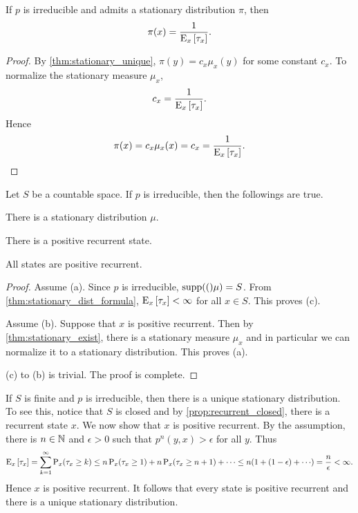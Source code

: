 \begin{theorem}\label{thm:stationary_dist_formula}
    If $p$ is irreducible and admits a stationary distribution $\pi$, 
    then 
    \begin{equation*}
        \pi(x) = \frac{1}{\operatorname{E}_x\left[ {\tau_x} \right]}. 
    \end{equation*}
\end{theorem}
\begin{proof}
    By \cref{thm:stationary_unique}, $\pi(y) = c_x\mu_x(y)$ 
    for some constant $c_x$. To normalize the stationary 
    measure $\mu_x$, 
    \begin{equation*}
        c_x = \frac{1}{\operatorname{E}_x\left[ {\tau_x} \right]}. 
    \end{equation*}
    Hence 
    \begin{equation*}
        \pi(x) = c_x\mu_x(x) = c_x = \frac{1}{\operatorname{E}_x\left[ {\tau_x} \right]}. 
    \end{equation*}
\end{proof}

\begin{theorem}\label{thm:stationary_recurrent}
    Let $S$ be a countable space. If $p$ is irreducible, then the 
    followings are true. 
    \begin{thmenum}
        \item There is a stationary distribution $\mu$. 
        \item There is a positive recurrent state. 
        \item All states are positive recurrent. 
    \end{thmenum}
\end{theorem}
\begin{proof}
    Assume (a). Since $p$ is irreducible, $\supp(\mu) = S$. 
    From \cref{thm:stationary_dist_formula}, $\operatorname{E}_x\left[ {\tau_x} \right]<\infty$ 
    for all $x\in S$. This proves (c). 

    Assume (b). Suppose that $x$ is positive recurrent. Then by 
    \cref{thm:stationary_exist}, there is a stationary measure $\mu_x$ 
    and in particular we can normalize it to a stationary distribution. 
    This proves (a). 

    (c) to (b) is trivial. The proof is complete. 
\end{proof}
\begin{remark}
    If $S$ is finite and $p$ is irreducible, then there is a unique stationary 
    distribution. To see this, notice that $S$ is closed and 
    by \cref{prop:recurrent_closed}, there is a recurrent state $x$. We 
    now show that $x$ is positive recurrent. By the assumption, there is 
    $n\in\mathbb{N}$ and $\epsilon>0$ such that $p^n(y,x)>\epsilon$ for all $y$. 
    Thus 
    \begin{equation*}
        \E_x\sbrc{\tau_x} = \sum_{k=1}^\infty \P_x(\tau_x\geq k) 
        \leq n\P_x(\tau_x\geq 1) + n\P_x(\tau_x\geq n+1) + \cdots 
        \leq n\pth{1 + (1-\epsilon) + \cdots} = \frac{n}{\epsilon}<\infty. 
    \end{equation*}
    Hence $x$ is positive recurrent. It follows that every state is 
    positive recurrent and there is a unique stationary distribution. 
\end{remark}

